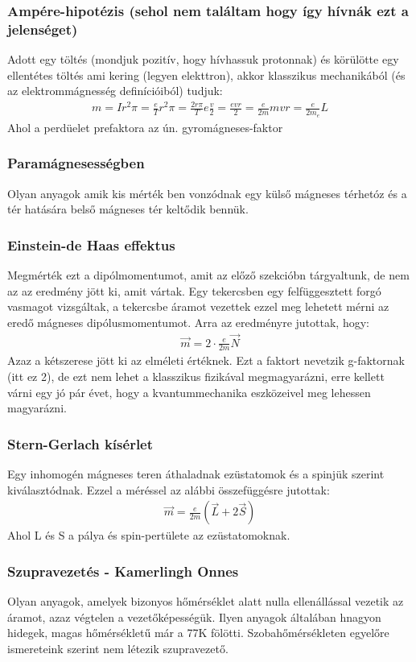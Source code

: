 \documentclass{article}
\begin{document}
\subsubsection{Ampére-hipotézis (sehol nem találtam hogy így hívnák ezt a jelenséget)}
Adott egy töltés (mondjuk pozitív, hogy hívhassuk protonnak) és körülötte egy ellentétes töltés ami kering (legyen elekttron), akkor klasszikus mechanikából (és az elektrommágnesség definícióiból) tudjuk:
\begin{gather*}
m=Ir^2\pi = \frac{e}{T} r^2\pi  = \frac{2r\pi}{T} e \frac{v}{2} =\frac{evr}{2} = \frac{e}{2m} mvr = \frac{e}{2m_e} L 
\end{gather*}
Ahol a perdüelet prefaktora az ún. gyromágneses-faktor
\subsubsection{Paramágnesességben}
Olyan anyagok amik kis mérték ben vonzódnak egy külső mágneses térhetóz és a tér hatására belső mágneses tér keltődik bennük.
\subsubsection{Einstein-de Haas effektus}
Megmérték ezt a dipólmomentumot, amit az előző szekcióbn tárgyaltunk, de nem az az eredmény jött ki, amit vártak. Egy tekercsben egy felfüggesztett forgó vasmagot vizsgáltak, a tekercsbe áramot vezettek ezzel meg lehetett mérni az eredő mágneses dipólusmomentumot. Arra az eredményre jutottak, hogy:
\begin{gather*}
\vec{m} = 2 \cdot \frac{e}{2m} \vec{N}
\end{gather*}
Azaz a kétszerese jött ki az elméleti értéknek. Ezt a faktort nevetzik g-faktornak (itt ez 2), de ezt nem lehet a klasszikus fizikával megmagyarázni, erre kellett várni egy jó pár évet, hogy a kvantummechanika eszközeivel meg lehessen magyarázni.
\subsubsection{Stern-Gerlach kísérlet}
Egy inhomogén mágneses teren áthaladnak ezüstatomok és a spinjük szerint kiválasztódnak. Ezzel a méréssel az alábbi összefüggésre jutottak:
\begin{gather*}
\vec{m} = \frac{e}{2m} (\vec{L} + 2\vec{S})
\end{gather*}
Ahol L és S a pálya és spin-pertülete az ezüstatomoknak.
\subsubsection{Szupravezetés - Kamerlingh Onnes}
Olyan anyagok, amelyek bizonyos hőmérséklet alatt nulla ellenállással vezetik az áramot, azaz végtelen a vezetőképességük. Ilyen anyagok általában hnagyon hidegek, magas hőmérsékletű már a 77K fölötti. Szobahőmérsékleten egyelőre ismereteink szerint nem létezik szupravezető.
\end{document}
